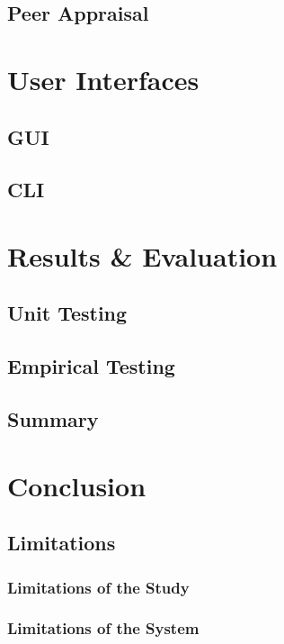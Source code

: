 \documentclass[a4paper, 11pt, twocolumn, twoside]{report}
\begin{document}
\section{Peer Appraisal}

\chapter{User Interfaces}

\section{GUI}

\section{CLI}

\chapter{Results \& Evaluation}

\section{Unit Testing}

\section{Empirical Testing}

\section{Summary}

\chapter{Conclusion}

\section{Limitations}

\subsection{Limitations of the Study}

\subsection{Limitations of the System}
\end{document}
